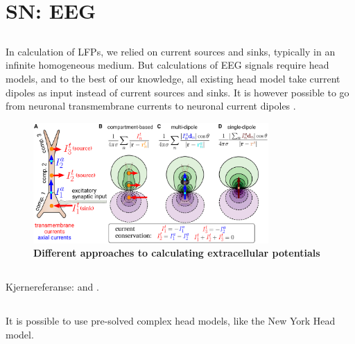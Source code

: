 \chapter{SN: EEG}
\label{sec:EEG}

\section{}
In calculation of LFPs, we relied on current sources and sinks, typically in an infinite homogeneous medium. But calculations of EEG signals require head models, and to the best of our knowledge, all existing head model take current dipoles as input instead of current sources and sinks. It is however possible to go from neuronal transmembrane currents to neuronal current dipoles \cite{Naess2020}.

\begin{figure}[!ht]
\begin{center}
\includegraphics[width=0.8\textwidth]{Figures/EEG/illustration_imem_iaxial.pdf}
\end{center}
\caption{\textbf{Different approaches to calculating extracellular potentials} 
}
\label{VC:fig:pointsource}
\end{figure}

\section{} 
Kjernereferanse: \cite{Naess2017} and \cite{Naess2020}.

\section{} 
It is possible to use pre-solved complex head models, like the New York Head model.

